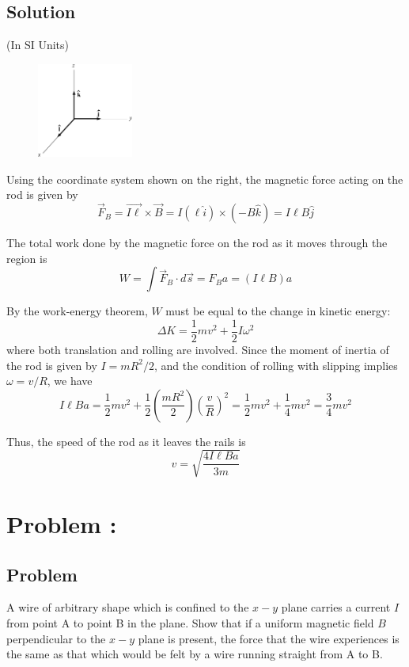 \documentclass[solutions]{esg8022pset}
\begin{document}
\subsection{Solution}
  (In SI Units)

  \begin{figure}
    \centering
    \includegraphics[width=0.28\textwidth]{ps07_sol_03_1}
  \end{figure}
  Using the coordinate system shown on the right, the magnetic force acting on the rod is given by
  $$\vec F_B = \vec{I \ell}\times \vec B = I (\ell \hat i) \times (-B\hat k) = I\ell B \hat j$$

  The total work done by the magnetic force on the rod as it moves through the region is
  $$W = \int \vec F_B\cdot d\vec s = F_B a = (I\ell B)a$$

  By the work-energy theorem, $W$ must be equal to the change in kinetic energy:
  $$\Delta K = \frac12 m v^2 + \frac12 I \omega^2$$
  where both translation and rolling are involved. Since the moment of inertia of the rod is given by $I = mR^2 / 2$, and the condition of rolling with slipping implies $\omega = v / R$, we have
  $$I \ell B a = \frac12 m v^2 + \frac12 \left(\frac{m R^2}{2}\right)\left(\frac{v}{R}\right)^2 = \frac12 m v^2 + \frac14 m v^2 = \frac34 m v^2$$

  Thus, the speed of the rod as it leaves the rails is
  $$v = \sqrt{\frac{4I\ell B a}{3m}}$$
\section{Problem \thesection: }
\subsection{Problem}
  A wire of arbitrary shape which is confined to the $x-y$ plane carries a current $I$ from point A to point B in the plane. Show that if a uniform magnetic field $B$ perpendicular to the $x-y$ plane is present, the force that the wire experiences is the same as that which would be felt by a wire running straight from A to B.
\end{document}

